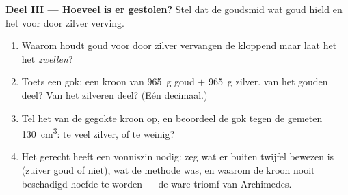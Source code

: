 \begin{problem}
\medskip\noindent\textbf{Deel III --- Hoeveel is er gestolen?}
Stel dat de goudsmid wat goud hield en het  voor  door
zilver verving.
\begin{enumerate}[resume]
  \item Waarom houdt goud  voor  door zilver vervangen de
         kloppend maar laat het het  \emph{zwellen}?
  \item Toets een gok: een kroon van \qty{965}{g} goud $+$
        \qty{965}{g} zilver.  van het gouden deel? Van het
        zilveren deel? (Eén decimaal.)
  \item Tel het  van de gegokte kroon op, en beoordeel de gok
        tegen de gemeten \qty{130}{cm^3}: te veel zilver, of te
        weinig?
  \item Het gerecht heeft een vonniszin nodig: zeg wat er buiten
        twijfel bewezen is (zuiver goud of niet), wat de methode was,
        en waarom de kroon nooit beschadigd hoefde te worden --- de
        ware triomf van Archimedes.
\end{enumerate}
\end{problem}
